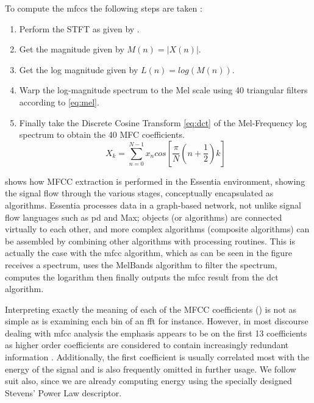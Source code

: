 {{To compute the \acrshort{mfcc}s the following steps are taken \citep{Logan2000, Lyons2015}:

\begin{enumerate}
  \item Perform the STFT as given by .
  \item Get the magnitude given by $M(n) = |X(n)|$.
  \item Get the log magnitude given by $L(n) = log(M(n))$.
  \item Warp the log-magnitude spectrum to the Mel scale using 40 triangular filters according to \eqref{eq:mel}.
  \item Finally take the Discrete Cosine Transform \eqref{eq:dct} of the Mel-Frequency log spectrum to obtain the 40 MFC coefficients.
  \begin{equation}
	\label{eq:dct}	
	X_k=\sum_{n=0}^{N-1}x_n cos [\frac{\pi}{N}(n+\frac{1}{2})k]
	\end{equation}
\end{enumerate}

 shows how MFCC extraction is performed in the Essentia environment, showing the signal flow through the various stages, conceptually encapsulated as algorithms. Essentia processes data in a graph-based network, not unlike signal flow languages such as \acrshort{pd} and Max; objects (or algorithms) are connected virtually to each other, and more complex algorithms (composite algorithms) can be assembled by combining other algorithms with processing routines. This is actually the case with the \acrshort{mfcc} algorithm, which as can be seen in the figure receives a spectrum, uses the MelBands algorithm to filter the spectrum, computes the logarithm then finally outputs the \acrshort{mfcc} result from the \acrshort{dct} algorithm. 



Interpreting exactly the meaning of each of the MFCC coefficients () is not as simple as is examining each bin of an \acrshort{fft} for instance. However, in most discourse dealing with \acrshort{mfcc} analysis the emphasis appears to be on the first 13 coefficients as higher order coefficients are considered to contain increasingly redundant information \citep{Logan2000}. Additionally, the first coefficient is usually correlated most with the energy of the signal and is also frequently omitted in further usage.  We follow suit also, since we are already computing energy using the specially designed Stevens' Power Law descriptor.

}}
